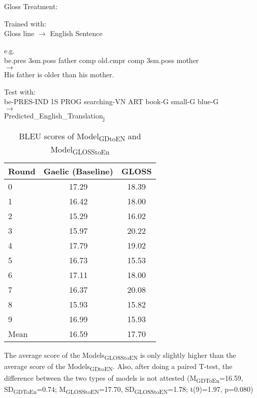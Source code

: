 \documentclass[a4paper]{article}
\begin{document}
\begin{exe}  
\ex Gloss Treatment: 
\begin{xlist}
	\ex Trained with:\\
	 Gloss line $\rightarrow$ English Sentence 
	\begin{xlist}
		\ex e.g. \\
			be.pres 3sm.poss father comp old.cmpr comp 3sm.poss mother \\
			$\rightarrow$ \\
			His father is older than his mother.
	\end{xlist}
	\ex Test with:\\
		be-PRES-IND 1S PROG searching-VN ART book-G small-G blue-G\\
		$\rightarrow$ \\
		Predicted\_English\_Translation\textsubscript{j}
\end{xlist}
\end{exe}

\begin{table}[ht]
\centering
\begin{tabular}{lcc}
  \hline
Round & Gaelic (Baseline) & GLOSS \\ 
  \hline
0 & 17.29 & 18.39 \\ 
  1 & 16.42 & 18.00 \\ 
  2 & 15.29 & 16.02 \\ 
  3 & 15.97 & 20.22 \\ 
  4 & 17.79 & 19.02 \\ 
  5 & 16.73 & 15.53 \\ 
  6 & 17.11 & 18.00 \\ 
  7 & 16.37 & 20.08 \\ 
  8 & 15.93 & 15.82 \\ 
  9 & 16.99 & 15.93 \\ 
   \hline
Mean & 16.59 & 17.70 \\ 
   \hline
\end{tabular}
\caption{BLEU scores of Model\textsubscript{GDtoEN} and Model\textsubscript{GLOSStoEn}} 
\label{Table:GLOSS}
\end{table}
The average score of the Models\textsubscript{GLOSStoEN} is only slightly higher than the average score of the Models\textsubscript{GDtoEN}.
Also, after doing a paired T-test, the difference between the two types of models is not attested
(M\textsubscript{GDToEn}=16.59, SD\textsubscript{GDToEn}=0.74; M\textsubscript{GLOSStoEN}=17.70, SD\textsubscript{GLOSStoEN}=1.78; t(9)=1.97, p=0.080)
\end{document}
